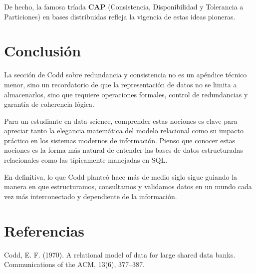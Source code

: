 \documentclass{article}
\begin{document}
De hecho, la famosa tríada \textbf{CAP} (Consistencia, Disponibilidad y Tolerancia a Particiones) en bases distribuidas refleja la vigencia de estas ideas pioneras.



\section*{Conclusión}
La sección de Codd sobre redundancia y consistencia no es un apéndice técnico menor, sino un recordatorio de que la representación de datos no se limita a almacenarlos, sino que requiere operaciones formales, control de redundancias y garantía de coherencia lógica.

Para un estudiante en data science, comprender estas nociones es clave para apreciar tanto la elegancia matemática del modelo relacional como su impacto práctico en los sistemas modernos de información. Pienso que conocer estas nociones es la forma más natural de entender las bases de datos estructuradas relacionales como las típicamente manejadas en SQL. 

En definitiva, lo que Codd planteó hace más de medio siglo sigue guiando la manera en que estructuramos, consultamos y validamos datos en un mundo cada vez más interconectado y dependiente de la información.

\section*{Referencias}
Codd, E. F. (1970). A relational model of data for large shared data banks. Communications of the ACM, 13(6), 377–387.
\end{document}
